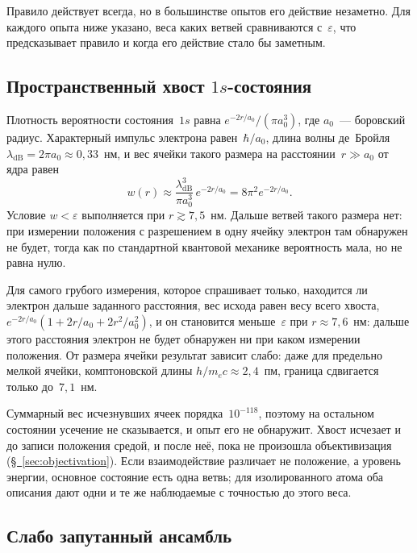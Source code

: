 \documentclass[11pt,a4paper]{article}
\begin{document}
Правило действует всегда, но в большинстве опытов его действие незаметно. Для каждого опыта ниже указано, веса каких ветвей сравниваются с~$\varepsilon$, что предсказывает правило и когда его действие стало бы заметным.

\subsection{Пространственный хвост $1s$-состояния}
\label{sec:tail}

Плотность вероятности состояния~$1s$ равна $e^{-2r/a_0}/(\pi a_0^3)$, где $a_0$~--- боровский радиус. Характерный импульс электрона равен~$\hbar/a_0$, длина волны де~Бройля $\lambda_{\mathrm{dB}}=2\pi a_0\approx0{,}33$~нм, и вес ячейки такого размера на расстоянии~$r\gg a_0$ от ядра равен
\begin{equation}
w(r)\approx\frac{\lambda_{\mathrm{dB}}^3}{\pi a_0^3}\,e^{-2r/a_0}=8\pi^2e^{-2r/a_0}.
\end{equation}
Условие $w<\varepsilon$ выполняется при $r\gtrsim7{,}5$~нм. Дальше ветвей такого размера нет: при измерении положения с разрешением в одну ячейку электрон там обнаружен не будет, тогда как по стандартной квантовой механике вероятность мала, но не равна нулю.

Для самого грубого измерения, которое спрашивает только, находится ли электрон дальше заданного расстояния, вес исхода равен весу всего хвоста, $e^{-2r/a_0}(1+2r/a_0+2r^2/a_0^2)$, и он становится меньше~$\varepsilon$ при $r\approx7{,}6$~нм: дальше этого расстояния электрон не будет обнаружен ни при каком измерении положения. От размера ячейки результат зависит слабо: даже для предельно мелкой ячейки, комптоновской длины $h/m_ec\approx2{,}4$~пм, граница сдвигается только до~$7{,}1$~нм.

Суммарный вес исчезнувших ячеек порядка~$10^{-118}$, поэтому на остальном состоянии усечение не сказывается, и опыт его не обнаружит. Хвост исчезает и до записи положения средой, и после неё, пока не произошла объективизация (\hyperref[sec:objectivation]{\S~\ref*{sec:objectivation}}). Если взаимодействие различает не положение, а уровень энергии, основное состояние есть одна ветвь; для изолированного атома оба описания дают одни и те же наблюдаемые с точностью до этого веса.

\subsection{Слабо запутанный ансамбль}
\label{sec:fountain}
\end{document}
